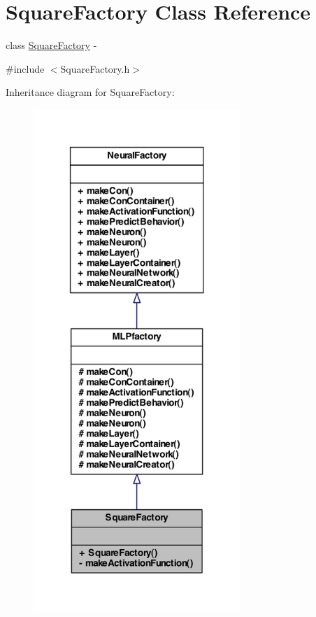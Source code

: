 \hypertarget{class_square_factory}{
\section{SquareFactory Class Reference}
\label{class_square_factory}
}


class \hyperlink{class_square_factory}{SquareFactory} -\/  




{\ttfamily \#include $<$SquareFactory.h$>$}



Inheritance diagram for SquareFactory:
\nopagebreak
\begin{figure}[H]
\begin{center}
\leavevmode
\includegraphics[width=222pt]{class_square_factory__inherit__graph}
\end{center}
\end{figure}


